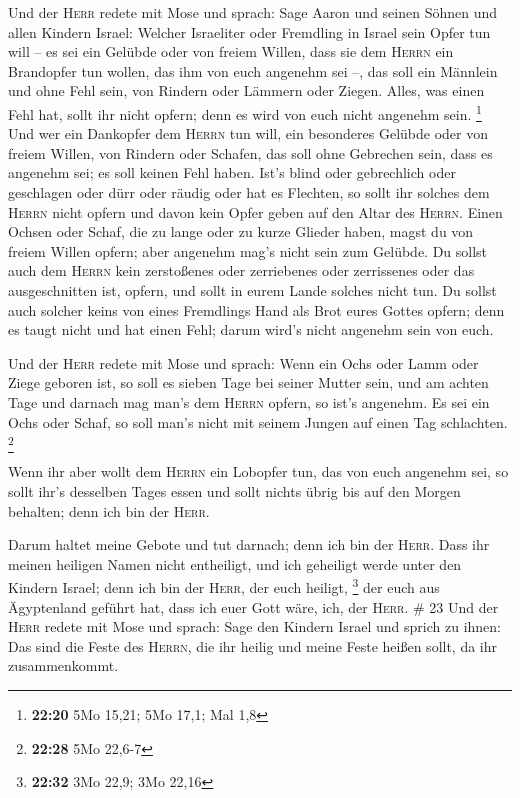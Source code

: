  Und der \textsc{Herr} redete mit Mose und sprach:
 Sage Aaron und seinen Söhnen und allen Kindern Israel:
Welcher Israeliter oder Fremdling in Israel sein Opfer tun will -- es
sei ein Gelübde oder von freiem Willen, dass sie dem \textsc{Herrn} ein
Brandopfer tun wollen, das ihm von euch angenehm sei --, 
das soll ein Männlein und ohne Fehl sein, von Rindern oder Lämmern oder
Ziegen.  Alles, was einen Fehl hat, sollt ihr nicht
opfern; denn es wird von euch nicht angenehm sein. \footnote{\textbf{22:20}
  5Mo 15,21; 5Mo 17,1; Mal 1,8}  Und wer ein Dankopfer
dem \textsc{Herrn} tun will, ein besonderes Gelübde oder von freiem
Willen, von Rindern oder Schafen, das soll ohne Gebrechen sein, dass es
angenehm sei; es soll keinen Fehl haben.  Ist's blind
oder gebrechlich oder geschlagen oder dürr oder räudig oder hat es
Flechten, so sollt ihr solches dem \textsc{Herrn} nicht opfern und davon
kein Opfer geben auf den Altar des \textsc{Herrn}.  Einen
Ochsen oder Schaf, die zu lange oder zu kurze Glieder haben, magst du
von freiem Willen opfern; aber angenehm mag's nicht sein zum Gelübde.
 Du sollst auch dem \textsc{Herrn} kein zerstoßenes oder
zerriebenes oder zerrissenes oder das ausgeschnitten ist, opfern, und
sollt in eurem Lande solches nicht tun.  Du sollst auch
solcher keins von eines Fremdlings Hand als Brot eures Gottes opfern;
denn es taugt nicht und hat einen Fehl; darum wird's nicht angenehm sein
von euch.

 Und der \textsc{Herr} redete mit Mose und sprach:
 Wenn ein Ochs oder Lamm oder Ziege geboren ist, so soll
es sieben Tage bei seiner Mutter sein, und am achten Tage und darnach
mag man's dem \textsc{Herrn} opfern, so ist's angenehm. 
Es sei ein Ochs oder Schaf, so soll man's nicht mit seinem Jungen auf
einen Tag schlachten. \footnote{\textbf{22:28} 5Mo 22,6-7}

 Wenn ihr aber wollt dem \textsc{Herrn} ein Lobopfer tun,
das von euch angenehm sei,  so sollt ihr's desselben
Tages essen und sollt nichts übrig bis auf den Morgen behalten; denn ich
bin der \textsc{Herr}.

 Darum haltet meine Gebote und tut darnach; denn ich bin
der \textsc{Herr}.  Dass ihr meinen heiligen Namen nicht
entheiligt, und ich geheiligt werde unter den Kindern Israel; denn ich
bin der \textsc{Herr}, der euch heiligt, \footnote{\textbf{22:32} 3Mo
  22,9; 3Mo 22,16}  der euch aus Ägyptenland geführt hat,
dass ich euer Gott wäre, ich, der \textsc{Herr}. \# 23 
Und der \textsc{Herr} redete mit Mose und sprach:  Sage
den Kindern Israel und sprich zu ihnen: Das sind die Feste des
\textsc{Herrn}, die ihr heilig und meine Feste heißen sollt, da ihr
zusammenkommt.

